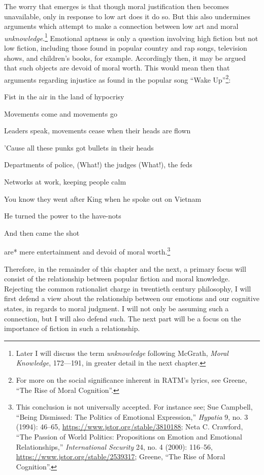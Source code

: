 \documentclass[phdthesis,12pt,final,a4paper]{wuthesis}
\theoremstyle{definition}
\theoremstyle{definition}
\theoremstyle{definition}
\theoremstyle{definition}
\theoremstyle{remark}
\begin{document}
The worry that emerges is that though moral justification then becomes unavailable, only in response to low art does it do so. But this also undermines arguments which attempt to make a connection between low art and moral \emph{unknowledge}.\footnote{Later I will discuss the term \emph{unknowledge} following McGrath, \emph{Moral {Knowledge}}, 172---191, in greater detail in the next chapter.} Emotional aptness is only a question involving high fiction but not low fiction, including those found in popular country and rap songs, television shows, and children's books, for example. Accordingly then, it may be argued that such objects are devoid of moral worth. This would mean then that arguments regarding injustice as found in the popular song ``Wake Up''\footnote{For more on the social significance inherent in RATM's lyrics, see Greene, {``The Rise of Moral Cognition''}.}:

Fist in the air in the land of hypocrisy

Movements come and movements go

Leaders speak, movements cease when their heads are flown

'Cause all these punks got bullets in their heads

Departments of police, (What!) the judges (What!), the feds

Networks at work, keeping people calm

You know they went after King when he spoke out on Vietnam

He turned the power to the have-nots

And then came the shot

\noindent *are* mere entertainment and devoid of moral worth.\footnote{This conclusion is not universally accepted. For instance see; Sue Campbell, {``Being {Dismissed}: {The Politics} of {Emotional Expression},''} \emph{Hypatia} 9, no. 3 (1994): 46--65, \url{https://www.jstor.org/stable/3810188}; Neta C. Crawford, {``The Passion of World Politics: Propositions on Emotion and Emotional Relationships,''} \emph{International Security} 24, no. 4 (2000): 116--56, \url{https://www.jstor.org/stable/2539317}; Greene, {``The Rise of Moral Cognition''}.}

Therefore, in the remainder of this chapter and the next, a primary focus will consist of the relationship between popular fiction and moral knowledge. Rejecting the common rationalist charge in twentieth century philosophy, I will first defend a view about the relationship between our emotions and our cognitive states, in regards to moral judgment. I will not only be assuming such a connection, but I will also defend such. The next part will be a focus on the importance of fiction in such a relationship.
\end{document}

